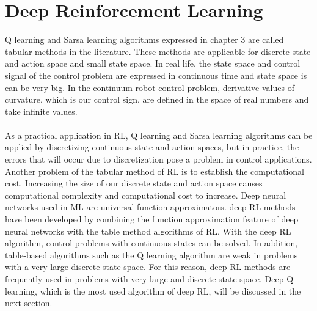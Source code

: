 \documentclass[12pt,twoside,a4]{mwbk}
\begin{document}
\section{Deep Reinforcement Learning}
Q learning and Sarsa learning algorithms expressed in chapter 3 are called tabular methods in the literature. These methods are applicable for discrete state and action space and small state space. In real life, the state space and control signal of the control problem are expressed in continuous time and state space is can be very big. In the continuum robot control problem, derivative values of curvature, which is our control sign, are defined in the space of real numbers and take infinite values. 
\\ \\
As a practical application in RL, Q learning and Sarsa learning algorithms can be applied by discretizing continuous state and action spaces, but in practice, the errors that will occur due to discretization pose a problem in control applications. Another problem of the tabular method of RL is to establish the computational cost. Increasing the size of our discrete state and action space causes computational complexity and computational cost to increase. Deep neural networks used in ML are universal function approximators. deep RL methods have been developed by combining the function approximation feature of deep neural networks with the table method algorithms of RL. With the deep RL algorithm, control problems with continuous states can be solved. In addition, table-based algorithms such as the Q learning algorithm are weak in problems with a very large discrete state space. For this reason, deep RL methods are frequently used in problems with very large and discrete state space. Deep Q learning, which is the most used algorithm of deep RL, will be discussed in the next section.
\end{document}
